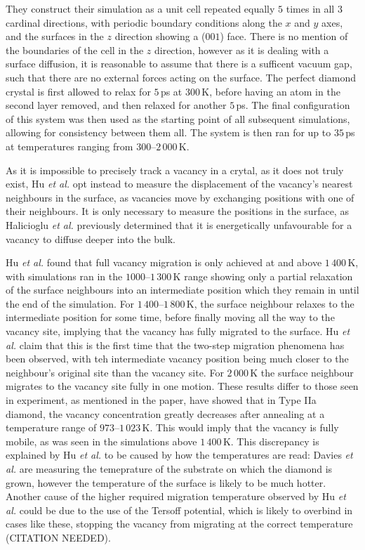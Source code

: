 \documentclass[10pt,a4paper,twocolumn,twoside]{extarticle}
\newcommand{\al}{\emph{et al. }}
\begin{document}
They construct their simulation as a unit cell repeated equally $5$ times in all $3$ cardinal directions, with periodic boundary conditions along the $x$ and $y$ axes, and the surfaces in the $z$ direction showing a ($001$) face. There is no mention of the boundaries of the cell in the $z$ direction, however as it is dealing with a surface diffusion, it is reasonable to assume that there is a sufficent vacuum gap, such that there are no external forces acting on the surface. The perfect diamond crystal is first allowed to relax for $5$\,ps at $300$\,K, before having an atom in the second layer removed, and then relaxed for another $5$\,ps. The final configuration of this system was then used as the starting point of all subsequent simulations, allowing for consistency between them all. The system is then ran for up to $35$\,ps at temperatures ranging from $300$--$2\,000$\,K. 

As it is impossible to precisely track a vacancy in a crytal, as it does not truly exist, Hu \al opt instead to measure the displacement of the vacancy's nearest neighbours in the surface, as vacancies move by exchanging positions with one of their neighbours. It is only necessary to measure the positions in the surface, as Halicioglu \al\cite{Halicioglu} previously determined that it is energetically unfavourable for a vacancy to diffuse deeper into the bulk. 

Hu \al found that full vacancy migration is only achieved at and above $1\,400$\,K, with simulations ran in the $1000$--$1\,300$\,K range showing only a partial relaxation of the surface neighbours into an intermediate position which they remain in until the end of the simulation. For $1\,400$--$1\,800$\,K, the surface neighbour relaxes to the intermediate position for some time, before finally moving all the way to the vacancy site, implying that the vacancy has fully migrated to the surface. Hu \al claim that this is the first time that the two-step migration phenomena has been observed, with teh intermediate vacancy position being much closer to the neighbour's original site than the vacancy site. For $2\,000$\,K the surface neighbour migrates to the vacancy site fully in one motion. These results differ to those seen in experiment, as mentioned in the paper, \textcite{Davies} have showed that in Type IIa diamond, the vacancy concentration greatly decreases after annealing at a temperature range of $973$--$1\,023$\,K. This would imply that the vacancy is fully mobile, as was seen in the simulations above $1\,400$\,K. This discrepancy is explained by Hu \al to be caused by how the temperatures are read: Davies \al are measuring the temeprature of the substrate on which the diamond is grown, however the temperature of the surface is likely to be much hotter. Another cause of the higher required migration temperature observed by Hu \al could be due to the use of the Tersoff potential, which is likely to overbind in cases like these, stopping the vacancy from migrating at the correct temperature (CITATION NEEDED).

\printbibliography
\end{document}
